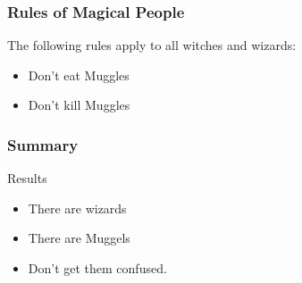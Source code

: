 \documentclass[aspectratio=169]{beamer}
\begin{document}
\begin{frame}
\frametitle{Rules of Magical People}

The following rules apply to all witches and wizards:
\begin{itemize}
\item Don't eat Muggles
\item Don't kill Muggles
\end{itemize}

\end{frame}

\begin{frame}
\frametitle{Summary}

\begin{block}{Results}
\begin{itemize}
  \item There are wizards
  \item There are Muggels
  \pause
  \item Don't get them confused.
\end{itemize}
\end{block}

\end{frame}
 
\end{document}
